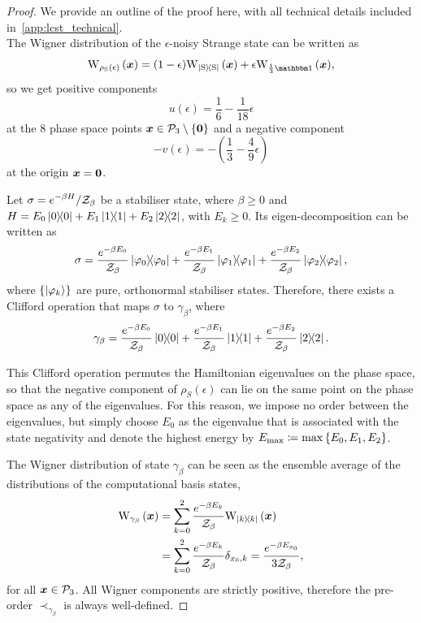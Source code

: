 \documentclass[pra,
aps,
twocolumn,
superscriptaddress,
groupedaddress,
nofootinbib,
reprint
]{revtex4-1}
\begin{document}
\begin{proof}
	We provide an outline of the proof here, with all technical details included in~\cref{app:lcst_technical}.\\

The Wigner distribution of the $\epsilon$-noisy Strange state can be written as 
\begin{equation}
	\W[\bmx]{\rho_{\rm{S}}(\epsilon)} = (1-\epsilon)\W[\bmx]{\ketbra{\rm{S}}} + \epsilon\W[\bmx]{\frac{1}{3}\id},
\end{equation}
so we get positive components
\begin{equation}
	u(\epsilon) = \frac{1}{6} -\frac{1}{18}\epsilon
\end{equation}
at the 8 phase space points $\bm{x} \in \mathcal{P}_3 \setminus \{\bm{0}\}$ and a negative component
\begin{equation}
	- v(\epsilon) = - \left( \frac{1}{3} -\frac{4}{9}\epsilon \right)
\end{equation}
at the origin $\bm{x} = \bm{0}$.

Let $\displaystyle \sigma = e^{-\beta H} / \mathcal{Z}_\beta$ be a stabiliser state, where $\beta \geq 0$ and $H = E_0 \ketbra{0} + E_1 \ketbra{1} + E_2 \ketbra{2}$, with $E_k \geq 0$.
Its eigen-decomposition can be written as 
\begin{equation}
	\sigma = \frac{e^{-\beta E_0}}{\mathcal{Z}_\beta} \ketbra{\varphi_0} + \frac{e^{-\beta E_1}}{\mathcal{Z}_\beta} \ketbra{\varphi_1} + \frac{e^{-\beta E_2}}{\mathcal{Z}_\beta} \ketbra{\varphi_2},
\end{equation}
where $\{\ket{\varphi_k}\}$ are pure, orthonormal stabiliser states. 
Therefore, there exists a Clifford operation that maps $\sigma$ to $\gamma_\beta$, where 
\begin{equation}
\gamma_\beta = \frac{e^{-\beta E_0}}{\mathcal{Z}_\beta} \ketbra{0} + \frac{e^{-\beta E_1}}{\mathcal{Z}_\beta} \ketbra{1} + \frac{e^{-\beta E_2}}{\mathcal{Z}_\beta} \ketbra{2}.
\end{equation}

This Clifford operation permutes the Hamiltonian eigenvalues on the phase space, so that the negative component of $\rho_S(\epsilon)$ can lie on the same point on the phase space as any of the eigenvalues.
For this reason, we impose no order between the eigenvalues, but simply choose $E_0$ as the eigenvalue that is associated with the state negativity and denote the highest energy by $E_{\rm{max}} \coloneqq \max{\{E_0, E_1, E_2\}}$.

The Wigner distribution of state $\gamma_\beta$ can be seen as the ensemble average of the distributions of the computational basis states,
\begin{align}
	\W[\bmx]{\gamma_\beta} &= \sum\limits_{k=0}^2 \frac{e^{-\beta E_k}}{\Z_\beta}\W[\bmx]{\ketbra{k}} \\
	&= \sum\limits_{k=0}^2 \frac{e^{-\beta E_k}}{\Z_\beta} \delta_{x_0, k} = \frac{e^{-\beta E_{x_0}}}{3\Z_\beta},
\end{align}
for all $\bm{x} \in \mathcal{P}_3$. 
All Wigner components are strictly positive, therefore the pre-order $\prec_{\gamma_\beta}$ is always well-defined.


\end{proof}
\end{document}
